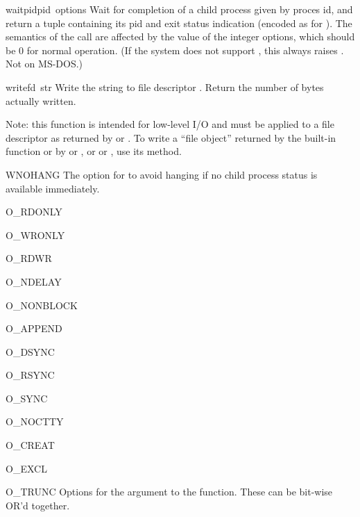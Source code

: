\begin{funcdesc}{waitpid}{pid\, options}
Wait for completion of a child process given by proces id, and return
a tuple containing its pid and exit status indication (encoded as for
).  The semantics of the call are affected by the value of
the integer options, which should be 0 for normal operation.  (If the
system does not support , this always raises
.  Not on MS-DOS.)
\end{funcdesc}

\begin{funcdesc}{write}{fd\, str}
Write the string  to file descriptor .
Return the number of bytes actually written.

Note: this function is intended for low-level I/O and must be applied
to a file descriptor as returned by  or
.  To write a ``file object'' returned by the
built-in function  or by  or
, or  or , use
its  method.
\end{funcdesc}

\begin{datadesc}{WNOHANG}
The option for  to avoid hanging if no child process
status is available immediately.
\end{datadesc}


\begin{datadesc}{O_RDONLY}
\end{datadesc}
\begin{datadesc}{O_WRONLY}
\end{datadesc}
\begin{datadesc}{O_RDWR}
\end{datadesc}
\begin{datadesc}{O_NDELAY}
\end{datadesc}
\begin{datadesc}{O_NONBLOCK}
\end{datadesc}
\begin{datadesc}{O_APPEND}
\end{datadesc}
\begin{datadesc}{O_DSYNC}
\end{datadesc}
\begin{datadesc}{O_RSYNC}
\end{datadesc}
\begin{datadesc}{O_SYNC}
\end{datadesc}
\begin{datadesc}{O_NOCTTY}
\end{datadesc}
\begin{datadesc}{O_CREAT}
\end{datadesc}
\begin{datadesc}{O_EXCL}
\end{datadesc}
\begin{datadesc}{O_TRUNC}
Options for the  argument to the  function.
These can be bit-wise OR'd together.
\end{datadesc}
